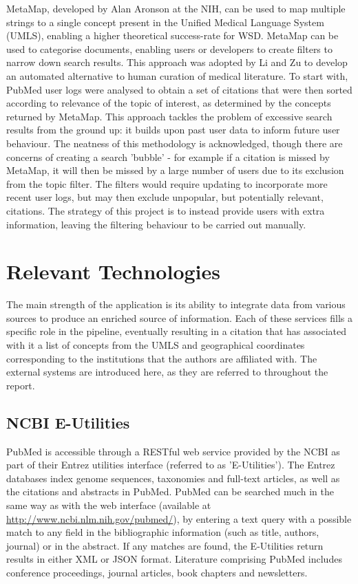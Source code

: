 \documentclass[Report.tex]{subfiles}
\begin{document}
\noindent MetaMap, developed by Alan Aronson at the NIH, can be used to map multiple strings to a single concept present in the Unified Medical Language System (UMLS), enabling a higher theoretical success-rate for WSD. MetaMap can be used to categorise documents, enabling users or developers to create filters to narrow down search results. This approach was adopted by Li and Zu\cite{lizu} to develop an automated alternative to human curation of medical literature. To start with, PubMed user logs were analysed to obtain a set of citations that were then sorted according to relevance of the topic of interest, as determined by the concepts returned by MetaMap. This approach tackles the problem of excessive search results from the ground up: it builds upon past user data to inform future user behaviour. The neatness of this methodology is acknowledged, though there are concerns of creating a search 'bubble' - for example if a citation is missed by MetaMap, it will then be missed by a large number of users due to its exclusion from the topic filter. The filters would require updating to incorporate more recent user logs, but may then exclude unpopular, but potentially relevant, citations. The strategy of this project is to instead provide users with extra information, leaving the filtering behaviour to be carried out manually. 

\section{Relevant Technologies}
The main strength of the application is its ability to integrate data from various sources to produce an enriched source of information. Each of these services fills a specific role in the pipeline, eventually resulting in a citation that has associated with it a list of concepts from the UMLS and geographical coordinates corresponding to the institutions that the authors are affiliated with. The external systems are introduced here, as they are referred to throughout the report.

\subsection{NCBI E-Utilities}
PubMed is accessible through a RESTful web service provided by the NCBI as part of their Entrez utilities interface (referred to as 'E-Utilities')\cite{eutils}. The Entrez databases index genome sequences, taxonomies and full-text articles, as well as the citations and abstracts in PubMed. PubMed can be searched much in the same way as with the web interface (available at \url{http://www.ncbi.nlm.nih.gov/pubmed/}), by entering a text query with a possible match to any field in the bibliographic information (such as title, authors, journal) or in the abstract. If any matches are found, the E-Utilities return results in either XML or JSON format. Literature comprising PubMed includes conference proceedings, journal articles, book chapters and newsletters.
\end{document}
